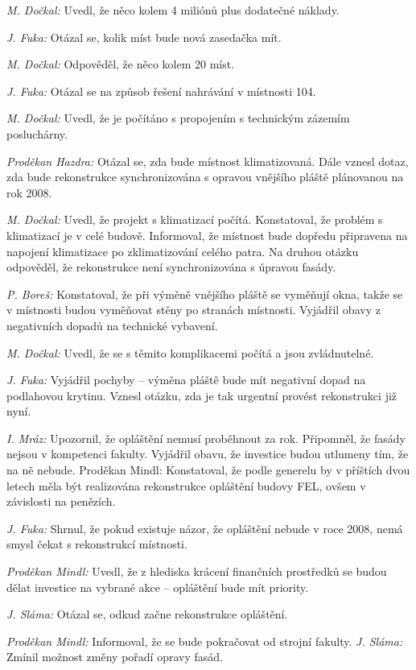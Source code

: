\documentclass[a4paper,12pt,notitlepage,oneside]{article}
\begin{document}
\textit{M. Dočkal:} Uvedl, že něco kolem 4 miliónů plus dodatečné náklady.

\textit{J. Fuka:} Otázal se, kolik míst bude nová zasedačka mít.

\textit{M. Dočkal:} Odpověděl, že něco kolem 20 míst.

\textit{J. Fuka:} Otázal se na způsob řešení nahrávání v místnosti 104.

\textit{M. Dočkal:} Uvedl, že je počítáno s propojením s technickým zázemím posluchárny.

\textit{Proděkan Hazdra:} Otázal se, zda bude místnost klimatizovaná. Dále vznesl dotaz, zda bude rekonstrukce synchronizována s opravou vnějšího pláště plánovanou na rok 2008.

\textit{M. Dočkal:} Uvedl, že projekt s klimatizací počítá. Konstatoval, že problém s klimatizací je v celé budově. Informoval, že místnost bude dopředu připravena na napojení klimatizace po zklimatizování celého patra. Na druhou otázku odpověděl, že rekonstrukce není synchronizována s úpravou fasády.

\textit{P. Boreš:} Konstatoval, že při výměně vnějšího pláště se vyměňují okna, takže se v místnosti budou vyměňovat stěny po stranách místnosti. Vyjádřil obavy z negativních dopadů na technické vybavení.

\textit{M. Dočkal:} Uvedl, že se s těmito komplikacemi počítá a jsou zvládnutelné.

\textit{J. Fuka:} Vyjádřil pochyby – výměna pláště bude mít negativní dopad na podlahovou krytinu. Vznesl otázku, zda je tak urgentní provést rekonstrukci již nyní.

\textit{I. Mráz:} Upozornil, že opláštění nemusí proběhnout za rok. Připomněl, že fasády nejsou v kompetenci fakulty. Vyjádřil obavu, že investice budou utlumeny tím, že na ně nebude. Proděkan Mindl: Konstatoval, že podle generelu by v příštích dvou letech měla být realizována rekonstrukce opláštění budovy FEL, ovšem v závislosti na penězích.

\textit{J. Fuka:} Shrnul, že pokud existuje názor, že opláštění nebude v roce 2008, nemá smysl čekat s rekonstrukcí místnosti.

\textit{Proděkan Mindl:} Uvedl, že z hlediska krácení finančních prostředků se budou dělat investice na vybrané akce – opláštění bude mít priority.

\textit{J. Sláma:} Otázal se, odkud začne rekonstrukce opláštění.

\textit{Proděkan Mindl:} Informoval, že se bude pokračovat od strojní fakulty.
\textit{J. Sláma:} Zmínil možnost změny pořadí opravy fasád.
\end{document}

